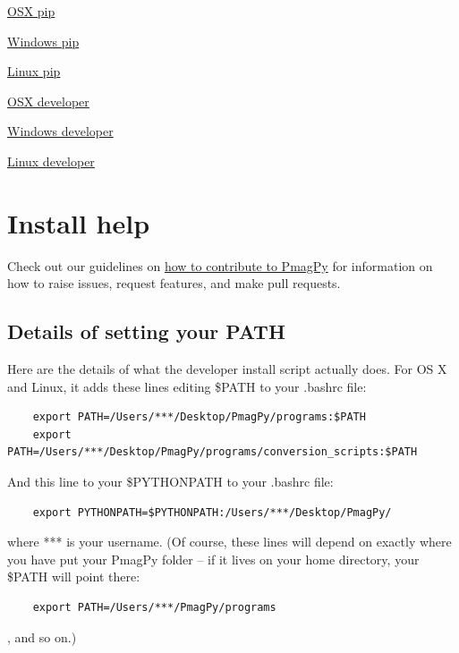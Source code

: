 \documentclass[11pt]{book}
\begin{document}
{\href{https://earthref.org/PmagPy/cookbook/osx_pip.html}{OSX pip}

\href{https://earthref.org/PmagPy/cookbook/windows_pip.html}{Windows pip}

\href{https://earthref.org/PmagPy/cookbook/linux_pip.html}{Linux pip}

\href{https://earthref.org/PmagPy/cookbook/osx_developer.html}{OSX developer}

\href{https://earthref.org/PmagPy/cookbook/windows_developer.html}{Windows developer}

\href{https://earthref.org/PmagPy/cookbook/linux_developer.html}{Linux developer}

\section{Install help}

Check out our guidelines on \href{https://github.com/PmagPy/PmagPy/blob/master/CONTRIBUTING.md}{how to contribute to PmagPy} for information on how to raise issues, request features, and make pull requests.


\subsection{Details of setting your PATH}
Here are the details of what the developer install script actually does.  For OS X and Linux, it adds these lines editing \$PATH to your .bashrc file:

\begin{verbatim}
    export PATH=/Users/***/Desktop/PmagPy/programs:$PATH
    export PATH=/Users/***/Desktop/PmagPy/programs/conversion_scripts:$PATH
\end{verbatim}

And this line to your \$PYTHONPATH to your .bashrc file:

\begin{verbatim}
    export PYTHONPATH=$PYTHONPATH:/Users/***/Desktop/PmagPy/
\end{verbatim}


where *** is your username.  (Of course, these lines will depend on exactly where you have put your PmagPy folder -- if it lives on your home directory, your \$PATH will point there:
\begin{verbatim}
    export PATH=/Users/***/PmagPy/programs
\end{verbatim}, and so on.)

}
\end{document}

